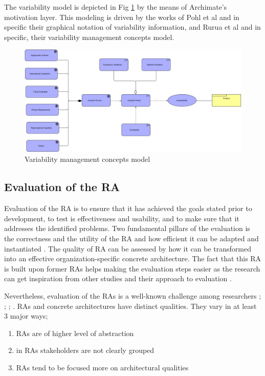 \documentclass[review]{elsarticle}
\begin{document}
The variability model is depicted in Fig \ref{variability} by the means of Archimate's motivation layer. This modeling is driven by the works of Pohl et al \cite{pohl2005software} and in specific their graphical notation of variability information, and Rurua et al \cite{rurua2019representing} and in specific, their variability management concepts model.

\begin{figure}[h!]
    \centering
    \includegraphics[width=12cm]{variability-model.JPG}
    \caption{Variability management concepts model}
    \label{variability}
\end{figure}

\subsection{Evaluation of the RA}

Evaluation of the RA is to ensure that it has achieved the goals stated prior to development, to test is effectiveness and usability, and to make sure that it addresses the identified problems. Two fundamental pillars of the evaluation is the correctness and the utility of the RA and how efficient it can be adapted and instantiated \cite{galster2011empirically}. The quality of RA can be assessed by how it can be transformed into an effective organization-specific concrete architecture. The fact that this RA is built upon former RAs helps making the evaluation steps easier as the research can get inspiration from other studies and their approach to evaluation \cite{sharpe2019industrial}.

Nevertheless, evaluation of the RAs is a well-known challenge among researchers \cite{angelov2008contracting}; \cite{Avgeriou}; \cite{Cioroaica}; \cite{Maier}. RAs and concrete architectures have distinct qualities. They vary in at least 3 major ways;

\begin{enumerate}
    \item RAs are of higher level of abstraction
    \item in RAs stakeholders are not clearly grouped
    \item RAs tend to be focused more on architectural qualities
\end{enumerate}
\end{document}
